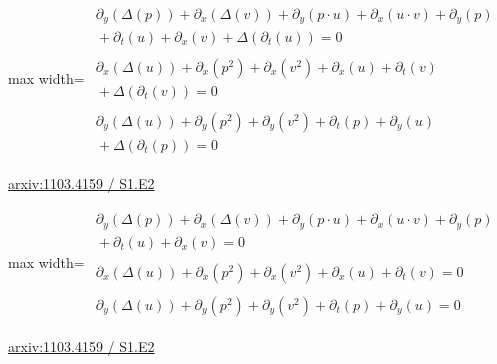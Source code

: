 \documentclass[UTF8,10pt,a4paper,fontset=mac]{ctexart}
\begin{document}
\begin{minipage}{\linewidth}\begin{center}\begin{adjustbox}{max width=\linewidth}$\displaystyle\begin{gathered}\begin{gathered}\partial_{y}(\Delta(p))+\partial_{x}(\Delta(v))+\partial_{y}(p\cdot u)+\partial_{x}(u\cdot v)+\partial_{y}(p)\\[-1pt]{}+\partial_{t}(u)+\partial_{x}(v)+\Delta(\partial_{t}(u))=0\end{gathered}\\[5pt]\begin{gathered}\partial_{x}(\Delta(u))+\partial_{x}(p^{2})+\partial_{x}(v^{2})+\partial_{x}(u)+\partial_{t}(v)\\[-1pt]{}+\Delta(\partial_{t}(v))=0\end{gathered}\\[5pt]\begin{gathered}\partial_{y}(\Delta(u))+\partial_{y}(p^{2})+\partial_{y}(v^{2})+\partial_{t}(p)+\partial_{y}(u)\\[-1pt]{}+\Delta(\partial_{t}(p))=0\end{gathered}\end{gathered}$\end{adjustbox}\end{center}{\small\href{https://arxiv.org/html/1103.4159#S1.E2}{arxiv:1103.4159 / S1.E2}}\par\end{minipage}\par\vspace{6mm}

\begin{minipage}{\linewidth}\begin{center}\begin{adjustbox}{max width=\linewidth}$\displaystyle\begin{gathered}\begin{gathered}\partial_{y}(\Delta(p))+\partial_{x}(\Delta(v))+\partial_{y}(p\cdot u)+\partial_{x}(u\cdot v)+\partial_{y}(p)\\[-1pt]{}+\partial_{t}(u)+\partial_{x}(v)=0\end{gathered}\\[5pt]\begin{gathered}\partial_{x}(\Delta(u))+\partial_{x}(p^{2})+\partial_{x}(v^{2})+\partial_{x}(u)+\partial_{t}(v)=0\end{gathered}\\[5pt]\begin{gathered}\partial_{y}(\Delta(u))+\partial_{y}(p^{2})+\partial_{y}(v^{2})+\partial_{t}(p)+\partial_{y}(u)=0\end{gathered}\end{gathered}$\end{adjustbox}\end{center}{\small\href{https://arxiv.org/html/1103.4159#S1.E2}{arxiv:1103.4159 / S1.E2}}\par\end{minipage}\par\vspace{6mm}
\end{document}
